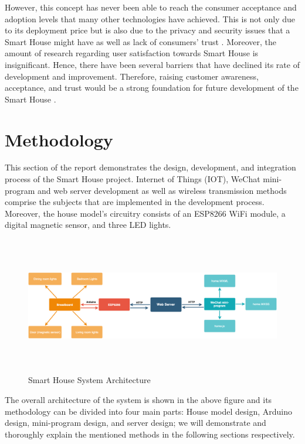 \documentclass[12pt,a4paper]{report}
\begin{document}
\vspace{0.2cm}
\noindent However, this concept has never been able to reach the consumer acceptance and adoption levels that many other technologies have achieved. This is not only due to its deployment price but is also due to the privacy and security issues that a Smart House might have as well as lack of consumers' trust \cite{haha}. Moreover, the amount of research regarding user satisfaction towards Smart House is insignificant. Hence, there have been several barriers that have declined its rate of development and improvement. Therefore, raising customer awareness, acceptance, and trust would be a strong foundation for future development of the Smart House \cite{yaya}.


\chapter{Methodology} 
This section of the report demonstrates the design, development, and integration process of the Smart House project. Internet of Things (IOT), WeChat mini-program and web server development as well as wireless transmission methods comprise the subjects that are implemented in the development process. Moreover, the house model's circuitry consists of an ESP8266 WiFi module, a digital magnetic sensor, and three LED lights. 
\begin{figure}[H]
	\centering
	\includegraphics[height=6cm,width=16cm]{figures/system.PNG}
	\caption{Smart House System Architecture}
\end{figure}

\noindent The overall architecture of the system is shown in the above figure and its methodology can be divided into four main parts: House model design, Arduino design, mini-program design, and server design; we will demonstrate and thoroughly explain the mentioned methods in the following sections respectively. 

\vspace{10cm}
\end{document}
